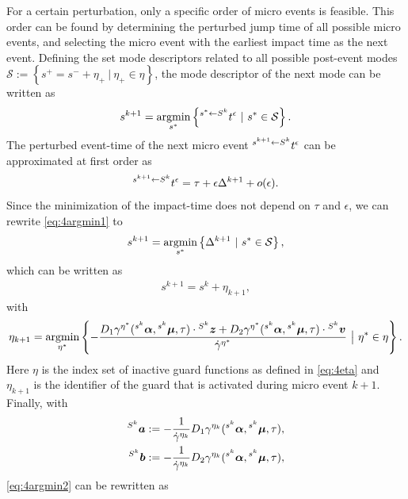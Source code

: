 \documentclass[../DC2017114Bouma.tex]{subfiles}
\begin{document}
For a certain perturbation, only a specific order of micro events is feasible. This order can be found by determining the perturbed jump time of all possible micro events, and selecting the micro event with the earliest impact time as the next event. Defining the set mode descriptors related to all possible post-event modes $\mathcal{S} := \left\{ s^+ = s^- + \eta_+ \ |\ \eta_+\in \eta \right\}$, the mode descriptor of the next mode can be written as
%
\begin{align}
s^{k+1} = \underset{s^{\ast}}{\operatorname{\text{argmin}}}\left\{\hspace{0cm}^{s^{\ast} \leftarrow S^{k}}t^\epsilon\ |\ s^{\ast}\in\mathcal{S}\right\}.\label{eq:4argmin1}
\end{align}
The perturbed event-time of the next micro event $\hspace{0cm}^{s^{k+1} \leftarrow S^{k}}t^\epsilon$ can be approximated at first order as
\begin{align}
\hspace{0cm}^{s^{k+1} \leftarrow S^{k}}t^\epsilon = \tau + \epsilon\Delta^{k+1} + o(\epsilon).
\end{align}
Since the minimization of the impact-time does not depend on $\tau$ and $\epsilon$, we can rewrite \eqref{eq:4argmin1} to
\begin{align}
s^{k+1} = \underset{s^{\ast}}{\argmin}\left\{\Delta^{k+1}\ |\ s^{\ast}\in\mathcal{S}\right\},
\end{align}
which can be written as
\begin{align}
s^{k+1} = s^k + \eta_{k+1},
\end{align}
with 
\begin{align}
\eta_{k+1} = \underset{\eta^\ast}{\argmin}\left\{-\frac{D_1\gamma^{\eta^\ast}(\ls^{s^k}\alphab,\ls^{s^k}\mub,\tau)\cdot\ls^{S^k}\zb + D_2\gamma^{\eta^\ast}(\ls^{s^k}\alphab,\ls^{s^k}\mub,\tau)\cdot\ls^{S^k}\vb}{\dot{\gamma}^{\eta^\ast}}\ \big|\ \eta^{\ast}\in\eta\right\}.\label{eq:4argmin2}
\end{align}
Here $\eta$ is the index set of inactive guard functions as defined in \eqref{eq:4eta} and $\eta_{k+1}$ is the identifier of the guard that is activated during micro event $k+1$. Finally, with
\begin{align*}
\hspace{0cm}^{S^k}{\boldsymbol{a}} &:= -\frac{1}{\dot{\gamma}^{\eta_k}}D_1\gamma^{\eta_k}(\hspace{0cm}^{s^k}\boldsymbol{\alpha},\hspace{0cm}^{s^k}\boldsymbol{\mu},\tau),\\
\hspace{0cm}^{S^k}{\boldsymbol{b}} &:= -\frac{1}{\dot{\gamma}^{\eta_k}}D_2\gamma^{\eta_k}(\hspace{0cm}^{s^k}\boldsymbol{\alpha},\hspace{0cm}^{s^k}\boldsymbol{\mu},\tau),
\end{align*}
\eqref{eq:4argmin2} can be rewritten as
\end{document}
